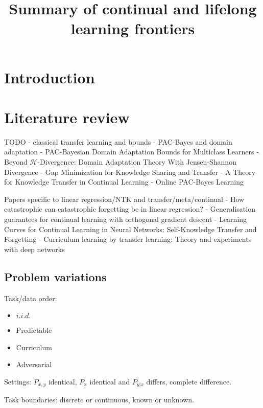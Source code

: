 \documentclass[letterpaper]{article}
\title{Summary of continual and lifelong learning frontiers}
\theoremstyle{definition}
\begin{document}
	
	\maketitle
	
	
\section{Introduction}
	

\section{Literature review}

TODO
- classical transfer learning and bounds
- PAC-Bayes and domain adaptation \citep{germain2020pac}
- PAC-Bayesian Domain Adaptation Bounds for Multiclass Learners \citep{sicilia2022pac}
- Beyond $\mathcal{H}$-Divergence: Domain Adaptation Theory With Jensen-Shannon Divergence \citep{shui2020beyond}
- Gap Minimization for Knowledge Sharing and Transfer \citep{wang2022gap}
- A Theory for Knowledge Transfer in Continual Learning \citep{benavides2022theory}
- Online PAC-Bayes Learning \citep{haddouche2022online}

Papers specific to linear regression/NTK and transfer/meta/continual
- How catastrophic can catastrophic forgetting be in linear regression? \citep{evron2022catastrophic}
- Generalisation guarantees for continual learning with orthogonal gradient descent \citep{bennani2020generalisation}
- Learning Curves for Continual Learning in Neural Networks: Self-Knowledge Transfer and Forgetting \citep{karakida2021learning}
- Curriculum learning by transfer learning: Theory and experiments with deep networks \citep{weinshall2018curriculum}

\subsection{Problem variations}

Task/data order:
\begin{itemize}
	\item $i.i.d.$
	\item Predictable
	\item Curriculum
	\item Adversarial
\end{itemize}

Settings: $P_{x,y}$ identical, $P_x$ identical and $P_{y|x}$ differs, complete difference.

Task boundaries: discrete or continuous, known or unknown.
\end{document}
